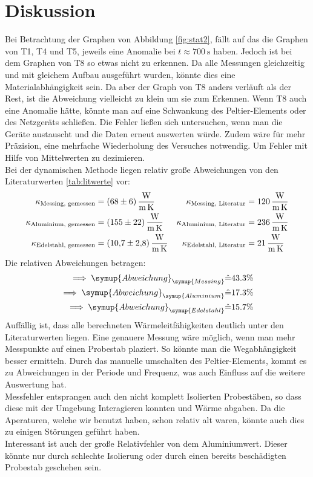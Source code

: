 \section{Diskussion}
\label{sec:Diskussion}
Bei Betrachtung der Graphen von Abbildung \ref{fig:stat2}, fällt auf das die Graphen von T1, T4 und T5, jeweils eine Anomalie bei $t \approx \SI{700}{\second}$ haben.
Jedoch ist bei dem Graphen von T8 so etwas nicht zu erkennen. Da alle Messungen gleichzeitig und mit gleichem Aufbau ausgeführt wurden, 
könnte dies eine Materialabhängigkeit sein. Da aber der Graph von T8 anders verläuft als der Rest, ist die Abweichung vielleicht zu klein um sie zum Erkennen.
Wenn T8 auch eine Anomalie hätte, könnte man auf eine Schwankung des Peltier-Elements oder des Netzgeräts schließen.
Die Fehler ließen sich untersuchen, wenn man die Geräte austauscht und die Daten erneut auswerten würde. 
Zudem wäre für mehr Präzision, eine mehrfache Wiederholung des Versuches notwendig. Um Fehler mit Hilfe von Mittelwerten zu dezimieren.
\\
Bei der dynamischen Methode liegen relativ große Abweichungen von den Literaturwerten \ref{tab:litwerte} vor:
\begin{align*}
    \kappa_\text{Messing, gemessen} &= \SI{68 \pm 6}{\watt\per\metre\per\kelvin} & \kappa_\text{Messing, Literatur} &= \SI{120}{\watt\per\metre\per\kelvin}\\
    \kappa_\text{Aluminium, gemessen} &= \SI{155 \pm 22}{\watt\per\metre\per\kelvin} & \kappa_\text{Aluminium, Literatur} &= \SI{236}{\watt\per\metre\per\kelvin}\\
    \kappa_\text{Edelstahl, gemessen} &= \SI{10.7 \pm 2.8}{\watt\per\metre\per\kelvin} & \kappa_\text{Edelstahl, Literatur} &= \SI{21}{\watt\per\metre\per\kelvin}
\end{align*}
Die relativen Abweichungen betragen:
\begin{align*}
    \implies \symup{Abweichung}_{\symup{Messing}} &\hat{=} 43.3 \%\\
    \implies \symup{Abweichung}_{\symup{Aluminium}} &\hat{=} 17.3\%\\
    \implies \symup{Abweichung}_{\symup{Edelstahl}} &\hat{=} 15.7 \%
\end{align*}
Auffällig ist, dass alle berechneten Wärmeleitfähigkeiten deutlich unter den Literaturwerten liegen.
Eine genauere Messung wäre möglich, wenn man mehr Messpunkte auf einen Probestab plaziert. So könnte man die Wegabhängigkeit besser ermitteln.
Durch das manuelle umschalten des Peltier-Elements, kommt es zu Abweichungen in der Periode und Frequenz, was auch Einfluss auf die weitere Auswertung hat.
\\
Messfehler entsprangen auch den nicht komplett Isolierten Probestäben, so dass diese mit der Umgebung Interagieren konnten und Wärme abgaben.
Da die Aperaturen, welche wir benutzt haben, schon relativ alt waren, könnte auch dies zu einigen Störungen geführt haben.
\\
Interessant ist auch der große Relativfehler von dem Aluminiumwert. Dieser könnte nur durch schlechte Isolierung oder durch einen bereits beschädigten Probestab geschehen sein.


